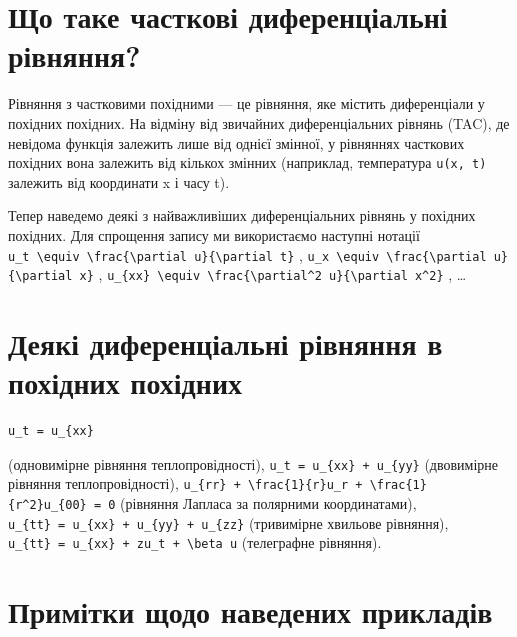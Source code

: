 \documentclass[
  ukrainian,
]{article}
\begin{document}
\section{Що таке часткові диференціальні
рівняння?}\label{ux449ux43e-ux442ux430ux43aux435-ux447ux430ux441ux442ux43aux43eux432ux456-ux434ux438ux444ux435ux440ux435ux43dux446ux456ux430ux43bux44cux43dux456-ux440ux456ux432ux43dux44fux43dux43dux44f}

Рівняння з частковими похідними --- це рівняння, яке містить
диференціали у похідних похідних. На відміну від звичайних
диференціальних рівнянь (TAC), де невідома функція залежить лише від
однієї змінної, у рівняннях часткових похідних вона залежить від кількох
змінних (наприклад, температура \texttt{u(x,\ t)} залежить від
координати x і часу t).

Тепер наведемо деякі з найважливіших диференціальних рівнянь у похідних
похідних. Для спрощення запису ми використаємо наступні нотації
\texttt{u\_t\ \textbackslash{}equiv\ \textbackslash{}frac\{\textbackslash{}partial\ u\}\{\textbackslash{}partial\ t\}}
,
\texttt{u\_x\ \textbackslash{}equiv\ \textbackslash{}frac\{\textbackslash{}partial\ u\}\{\textbackslash{}partial\ x\}}
,
\texttt{u\_\{xx\}\ \textbackslash{}equiv\ \textbackslash{}frac\{\textbackslash{}partial\^{}2\ u\}\{\textbackslash{}partial\ x\^{}2\}}
, \ldots{}

\section{Деякі диференціальні рівняння в похідних
похідних}\label{ux434ux435ux44fux43aux456-ux434ux438ux444ux435ux440ux435ux43dux446ux456ux430ux43bux44cux43dux456-ux440ux456ux432ux43dux44fux43dux43dux44f-ux432-ux43fux43eux445ux456ux434ux43dux438ux445-ux43fux43eux445ux456ux434ux43dux438ux445}

\begin{verbatim}
u_t = u_{xx}
\end{verbatim}

(одновимірне рівняння теплопровідності),
\texttt{u\_t\ =\ u\_\{xx\}\ +\ u\_\{yy\}} (двовимірне рівняння
теплопровідності),
\texttt{u\_\{rr\}\ +\ \textbackslash{}frac\{1\}\{r\}u\_r\ +\ \textbackslash{}frac\{1\}\{r\^{}2\}u\_\{00\}\ =\ 0}
(рівняння Лапласа за полярними координатами),
\texttt{u\_\{tt\}\ =\ u\_\{xx\}\ +\ u\_\{yy\}\ +\ u\_\{zz\}} (тривимірне
хвильове рівняння),
\texttt{u\_\{tt\}\ =\ u\_\{xx\}\ +\ zu\_t\ +\ \textbackslash{}beta\ u}
(телеграфне рівняння).

\section{Примітки щодо наведених
прикладів}\label{ux43fux440ux438ux43cux456ux442ux43aux438-ux449ux43eux434ux43e-ux43dux430ux432ux435ux434ux435ux43dux438ux445-ux43fux440ux438ux43aux43bux430ux434ux456ux432}
\end{document}
